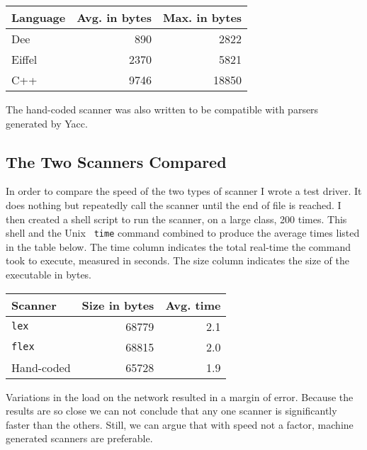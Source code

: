 \vspace{8mm}

\begin{tabular}{|l|r|r|} \hline
Language &  Avg. in bytes  & Max. in bytes  \\ \hline \hline
Dee      &  890   & 2822 \\ \hline
Eiffel   &  2370  & 5821 \\ \hline
C++      &  9746  & 18850 \\ \hline
\end{tabular}


\vspace{8mm}

The hand-coded scanner was also written to be compatible with parsers
generated by Yacc.


\subsection{The Two Scanners Compared}

In order to compare the speed of the two types of scanner I wrote a
test driver.  It does nothing but repeatedly call the scanner until
the end of file is reached.  I then created a shell script to run the
scanner, on a large class, 200 times.  This shell and the Unix {\tt
time} command combined to produce the average times listed in the
table below.  The time column indicates the total real-time the
command took to execute, measured in seconds.  The size column
indicates the size of the executable in bytes.

\vspace{8mm}

\begin{tabular}{|l|r|r|}  \hline
Scanner & Size in bytes & Avg. time \\ \hline \hline
{\tt lex}  & 68779 & 2.1 \\ \hline
{\tt flex} & 68815 & 2.0 \\ \hline
Hand-coded & 65728 & 1.9 \\ \hline
\end{tabular}

\vspace{8mm}

Variations in the load on the network resulted in a margin of error.
Because the results are so close we can not conclude that any one
scanner is significantly faster than the others.  Still, we can argue
that with speed not a factor, machine generated scanners are
preferable.

